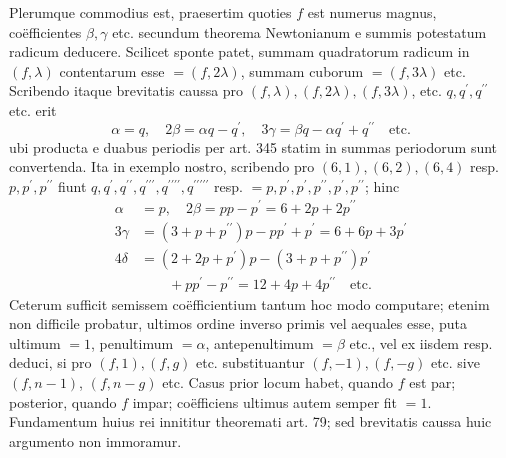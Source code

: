 Plerumque commodius est, praesertim quoties \(f\) est numerus magnus, coëfficientes \(\beta,\allowbreak \gamma\) etc. secundum theorema Newtonianum e summis potestatum radicum deducere. Scilicet sponte patet, summam quadratorum radicum in \((f,\lambda)\) contentarum esse \(=(f,2\lambda)\), summam cuborum \(=(f,3\lambda)\) etc. Scribendo itaque brevitatis caussa pro \((f,\lambda),\allowbreak (f,2\lambda),\allowbreak (f,3\lambda)\), etc. \(q,\allowbreak q^{\prime},\allowbreak q^{\prime\prime}\) etc. erit \[\alpha=q,\quad 2\beta=\alpha q-q^{\prime},\quad 3\gamma=\beta q-\alpha q^{\prime}+q^{\prime\prime}\quad\text{etc.}\] ubi producta e duabus periodis per art. 345 statim in summas periodorum sunt convertenda. Ita in exemplo nostro, scribendo pro \((6,1),\allowbreak (6,2),\allowbreak (6,4)\) resp. \(p,\allowbreak p^{\prime},\allowbreak p^{\prime\prime}\) fiunt \(q,\allowbreak q^{\prime},\allowbreak q^{\prime\prime},\allowbreak q^{\prime\prime\prime},\allowbreak q^{\prime\prime\prime\prime},\allowbreak q^{\prime\prime\prime\prime\prime}\) resp. \(=p,\allowbreak p^{\prime},\allowbreak p^{\prime},\allowbreak p^{\prime\prime},\allowbreak p^{\prime},\allowbreak p^{\prime\prime}\); hinc \[\begin{aligned}
\alpha&=p,\quad2\beta=pp-p^{\prime}=6+2p+2p^{\prime\prime}\\
3\gamma&=(3+p+p^{\prime\prime})p-pp^{\prime}+p^{\prime}=6+6p+3p^{\prime}\\
4\delta&=(2+2p+p^{\prime})p-(3+p+p^{\prime\prime})p^{\prime}\\
&\qquad+pp^{\prime}-p^{\prime\prime}=12+4p+4p^{\prime\prime}\quad\mathrm{etc.}
\end{aligned}\] Ceterum sufficit semissem coëfficientium tantum hoc modo computare; etenim non difficile probatur, ultimos ordine inverso primis vel aequales esse, puta ultimum \(=1\), penultimum \(=\alpha\), antepenultimum \(=\beta\) etc., vel ex iisdem resp. deduci, si pro \((f,1),\allowbreak (f,g)\) etc. substituantur \((f,-1),\allowbreak (f,-g)\) etc. sive \((f,n-1)\), \((f,n-g)\) etc. Casus prior locum habet, quando \(f\) est par; posterior, quando \(f\) impar; coëfficiens ultimus autem semper fit \(=1\). Fundamentum huius rei innititur theoremati art. 79; sed brevitatis caussa huic argumento non immoramur.

